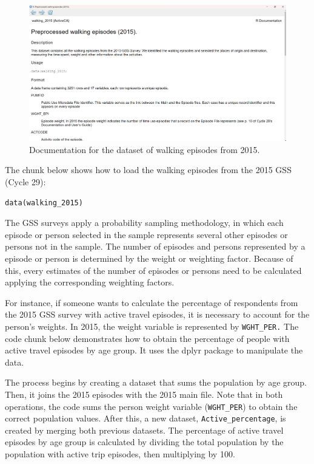 \documentclass[Royal,times,sageh]{sagej}
\begin{document}
\begin{figure}

{\centering \includegraphics[width=1\linewidth]{Manuscript-figures/walking-2015-documentation} 

}

\caption{Documentation for the dataset of walking episodes from 2015.}\label{fig:walking_documentation}
\end{figure}

The chunk below shows how to load the walking episodes from the 2015 GSS
(Cycle 29):

\begin{verbatim}
data(walking_2015)
\end{verbatim}

The GSS surveys apply a probability sampling methodology, in which each
episode or person selected in the sample represents several other
episodes or persons not in the sample. The number of episodes and
persons represented by a episode or person is determined by the weight
or weighting factor. Because of this, every estimates of the number of
episodes or persons need to be calculated applying the corresponding
weighting factors.

For instance, if someone wants to calculate the percentage of
respondents from the 2015 GSS survey with active travel episodes, it is
necessary to account for the person's weights. In 2015, the weight
variable is represented by \texttt{WGHT\_PER.} The code chunk below
demonstrates how to obtain the percentage of people with active travel
episodes by age group. It uses the dplyr package to manipulate the data.

The process begins by creating a dataset that sums the population by age
group. Then, it joins the 2015 episodes with the 2015 main file. Note
that in both operations, the code sums the person weight variable
(\texttt{WGHT\_PER}) to obtain the correct population values. After
this, a new dataset, \texttt{Active\_percentage}, is created by merging
both previous datasets. The percentage of active travel episodes by age
group is calculated by dividing the total population by the population
with active trip episodes, then multiplying by 100.
\end{document}
